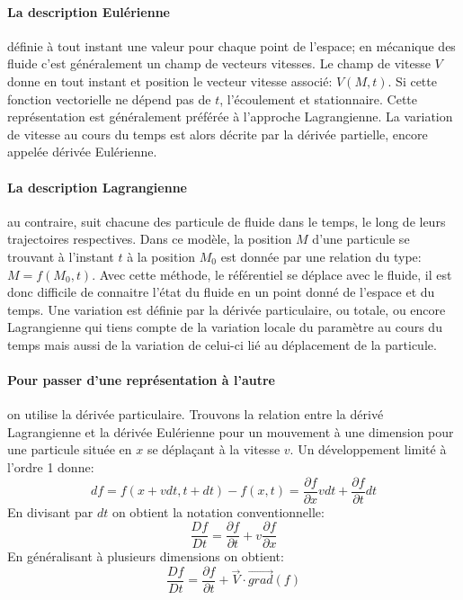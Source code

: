 \documentclass[10pt,a4paper]{article}
\begin{document}
\paragraph{La description Eulérienne\cite{desceuler}} définie à tout instant une valeur pour chaque point de l'espace; en mécanique des fluide c'est généralement un champ de vecteurs vitesses. Le champ de vitesse $V$ donne en tout instant et position le vecteur vitesse associé: $V(M, t)$. Si cette fonction vectorielle ne dépend pas de $t$, l'écoulement et stationnaire. Cette représentation est généralement préférée à l'approche Lagrangienne. La variation de vitesse au cours du temps est alors décrite par la dérivée partielle, encore appelée dérivée Eulérienne.

\paragraph{La description Lagrangienne\cite{desclagrange}} au contraire, suit chacune des particule de fluide dans le temps, le long de leurs trajectoires respectives. Dans ce modèle, la position $M$ d'une particule se trouvant à l'instant $t$ à la position $M_{0}$ est donnée par une relation du type: $M = f(M_{0}, t)$. Avec cette méthode, le référentiel se déplace avec le fluide, il est donc difficile de connaitre l'état du fluide en un point donné de l'espace et du temps. Une variation est définie par la dérivée particulaire, ou totale, ou encore Lagrangienne qui tiens compte de la variation locale du paramètre au cours du temps mais aussi de la variation de celui-ci lié au déplacement de la particule.

\paragraph{Pour passer d'une représentation à l'autre} on utilise la dérivée particulaire. Trouvons la relation entre la dérivé Lagrangienne et la dérivée Eulérienne pour un mouvement à une dimension pour une particule située en $x$ se déplaçant à la vitesse $v$. Un développement limité à l'ordre 1 donne:
\begin{equation}
df = f(x+vdt, t+dt) - f(x, t) = \frac{\partial f}{\partial x} vdt + \frac{\partial f}{\partial t} dt
\end{equation}
En divisant par $dt$ on obtient la notation conventionnelle:\begin{equation}
\frac{Df}{Dt} = \frac{\partial f}{\partial t} + v \frac{\partial f}{\partial x}
\end{equation}
En généralisant à plusieurs dimensions on obtient:
\begin{equation}
\frac{Df}{Dt} = \frac{\partial f}{\partial t} + \overrightarrow{V}\cdot\overrightarrow{grad}(f)
\end{equation}
\end{document}
